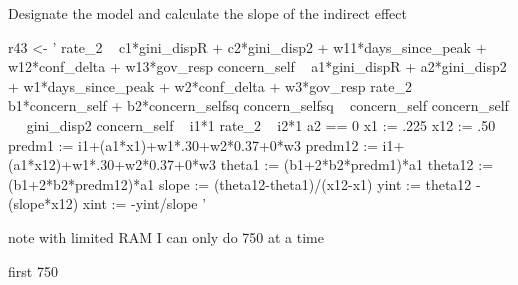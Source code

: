 \documentclass[
]{article}
\newenvironment{Shaded}{\begin{snugshade}}{\end{snugshade}}
\newcommand{\NormalTok}[1]{#1}
\newcommand{\StringTok}[1]{\textcolor[rgb]{0.31,0.60,0.02}{#1}}
\begin{document}
Designate the model and calculate the slope of the indirect effect

\begin{Shaded}
\begin{Highlighting}[]
\NormalTok{r43 <-}\StringTok{ '    rate_2 ~ c1*gini_dispR + c2*gini_disp2 + w11*days_since_peak + w12*conf_delta + w13*gov_resp}
\StringTok{             concern_self ~ a1*gini_dispR + a2*gini_disp2 + w1*days_since_peak + w2*conf_delta + w3*gov_resp }
\StringTok{             rate_2 ~ b1*concern_self + b2*concern_selfsq }
\StringTok{             concern_selfsq ~ concern_self}
\StringTok{             concern_self ~~ gini_disp2}
\StringTok{             concern_self ~ i1*1}
\StringTok{             rate_2 ~ i2*1}
\StringTok{             a2 == 0}
\StringTok{             x1 := .225}
\StringTok{             x12 := .50}
\StringTok{             predm1 := i1+(a1*x1)+w1*.30+w2*0.37+0*w3}
\StringTok{             predm12 := i1+(a1*x12)+w1*.30+w2*0.37+0*w3}
\StringTok{             theta1 := (b1+2*b2*predm1)*a1}
\StringTok{             theta12 := (b1+2*b2*predm12)*a1}
\StringTok{             slope := (theta12-theta1)/(x12-x1)}
\StringTok{             yint := theta12 - (slope*x12)}
\StringTok{             xint := -yint/slope}
\StringTok{         '}
\end{Highlighting}
\end{Shaded}

note with limited RAM I can only do 750 at a time

first 750
\end{document}
